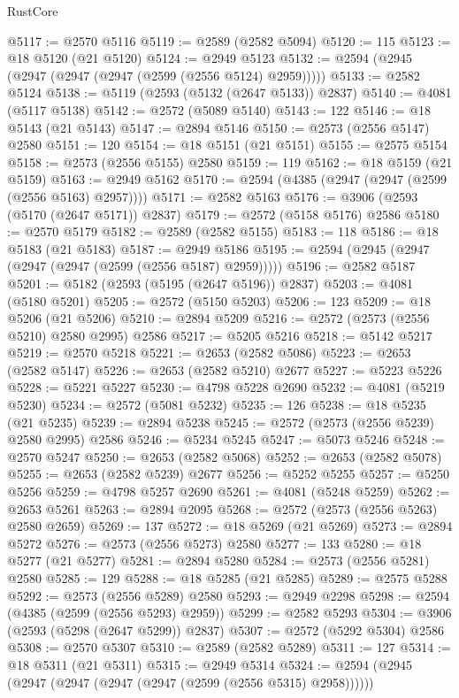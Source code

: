 \begin{lexlean}{RustCore}
\begin{coremodule}
@5117 := @2570 @5116
@5119 := @2589 (@2582 @5094)
@5120 := 115
@5123 := @18 @5120 (@21 @5120)
@5124 := @2949 @5123
@5132 := @2594 (@2945 (@2947 (@2947 (@2947 (@2599 (@2556 @5124) @2959)))))
@5133 := @2582 @5124
@5138 := @5119 (@2593 (@5132 (@2647 @5133)) @2837)
@5140 := @4081 (@5117 @5138)
@5142 := @2572 (@5089 @5140)
@5143 := 122
@5146 := @18 @5143 (@21 @5143)
@5147 := @2894 @5146
@5150 := @2573 (@2556 @5147) @2580
@5151 := 120
@5154 := @18 @5151 (@21 @5151)
@5155 := @2575 @5154
@5158 := @2573 (@2556 @5155) @2580
@5159 := 119
@5162 := @18 @5159 (@21 @5159)
@5163 := @2949 @5162
@5170 := @2594 (@4385 (@2947 (@2947 (@2599 (@2556 @5163) @2957))))
@5171 := @2582 @5163
@5176 := @3906 (@2593 (@5170 (@2647 @5171)) @2837)
@5179 := @2572 (@5158 @5176) @2586
@5180 := @2570 @5179
@5182 := @2589 (@2582 @5155)
@5183 := 118
@5186 := @18 @5183 (@21 @5183)
@5187 := @2949 @5186
@5195 := @2594 (@2945 (@2947 (@2947 (@2947 (@2599 (@2556 @5187) @2959)))))
@5196 := @2582 @5187
@5201 := @5182 (@2593 (@5195 (@2647 @5196)) @2837)
@5203 := @4081 (@5180 @5201)
@5205 := @2572 (@5150 @5203)
@5206 := 123
@5209 := @18 @5206 (@21 @5206)
@5210 := @2894 @5209
@5216 := @2572 (@2573 (@2556 @5210) @2580 @2995) @2586
@5217 := @5205 @5216
@5218 := @5142 @5217
@5219 := @2570 @5218
@5221 := @2653 (@2582 @5086)
@5223 := @2653 (@2582 @5147)
@5226 := @2653 (@2582 @5210) @2677
@5227 := @5223 @5226
@5228 := @5221 @5227
@5230 := @4798 @5228 @2690
@5232 := @4081 (@5219 @5230)
@5234 := @2572 (@5081 @5232)
@5235 := 126
@5238 := @18 @5235 (@21 @5235)
@5239 := @2894 @5238
@5245 := @2572 (@2573 (@2556 @5239) @2580 @2995) @2586
@5246 := @5234 @5245
@5247 := @5073 @5246
@5248 := @2570 @5247
@5250 := @2653 (@2582 @5068)
@5252 := @2653 (@2582 @5078)
@5255 := @2653 (@2582 @5239) @2677
@5256 := @5252 @5255
@5257 := @5250 @5256
@5259 := @4798 @5257 @2690
@5261 := @4081 (@5248 @5259)
@5262 := @2653 @5261
@5263 := @2894 @2095
@5268 := @2572 (@2573 (@2556 @5263) @2580 @2659)
@5269 := 137
@5272 := @18 @5269 (@21 @5269)
@5273 := @2894 @5272
@5276 := @2573 (@2556 @5273) @2580
@5277 := 133
@5280 := @18 @5277 (@21 @5277)
@5281 := @2894 @5280
@5284 := @2573 (@2556 @5281) @2580
@5285 := 129
@5288 := @18 @5285 (@21 @5285)
@5289 := @2575 @5288
@5292 := @2573 (@2556 @5289) @2580
@5293 := @2949 @2298
@5298 := @2594 (@4385 (@2599 (@2556 @5293) @2959))
@5299 := @2582 @5293
@5304 := @3906 (@2593 (@5298 (@2647 @5299)) @2837)
@5307 := @2572 (@5292 @5304) @2586
@5308 := @2570 @5307
@5310 := @2589 (@2582 @5289)
@5311 := 127
@5314 := @18 @5311 (@21 @5311)
@5315 := @2949 @5314
@5324 := @2594 (@2945 (@2947 (@2947 (@2947 (@2947 (@2599 (@2556 @5315) @2958))))))

\end{coremodule}
\end{lexlean}
